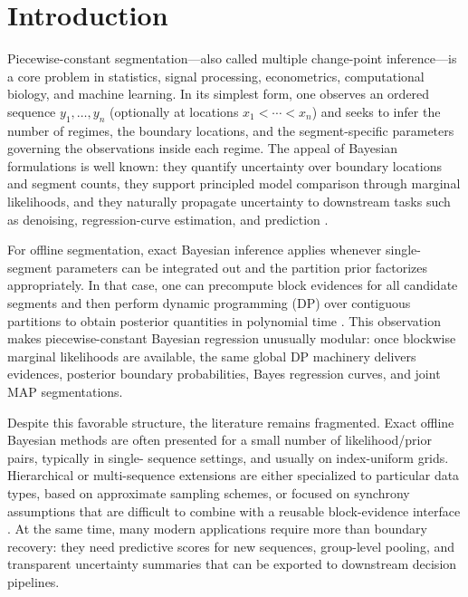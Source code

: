 \section{Introduction}

Piecewise-constant segmentation---also called multiple change-point inference---is a core
problem in statistics, signal processing, econometrics, computational biology, and machine
learning. In its simplest form, one observes an ordered sequence $y_1,\dots,y_n$ (optionally at
locations $x_1<\cdots<x_n$) and seeks to infer the number of regimes, the boundary locations,
and the segment-specific parameters governing the observations inside each regime. The appeal of
Bayesian formulations is well known: they quantify uncertainty over boundary locations and
segment counts, they support principled model comparison through marginal likelihoods, and they
naturally propagate uncertainty to downstream tasks such as denoising, regression-curve
estimation, and prediction \citep{barry1992ppm, barry1993bayesCP, fearnhead2006exact,
  hutter2006bpcr}.

For offline segmentation, exact Bayesian inference applies whenever single-segment
parameters can be integrated out and the partition prior factorizes appropriately. In that case,
one can precompute block evidences for all candidate segments and then perform dynamic
programming (DP) over contiguous partitions to obtain posterior quantities in polynomial time
\citep{fearnhead2006exact, hutter2006bpcr}. This observation makes piecewise-constant Bayesian
regression unusually modular: once blockwise marginal likelihoods are available, the same global
DP machinery delivers evidences, posterior boundary probabilities, Bayes regression curves, and
joint MAP segmentations.

Despite this favorable structure, the literature remains fragmented. Exact offline Bayesian
methods are often presented for a small number of likelihood/prior pairs, typically in single-
sequence settings, and usually on index-uniform grids. Hierarchical or multi-sequence extensions
are either specialized to particular data types, based on approximate sampling schemes, or focused
on synchrony assumptions that are difficult to combine with a reusable block-evidence interface
\citep{carlin1992hierBayesCP, fearnhead2011dependence, fan2017basic, quinlan2024jrpm}. At the
same time, many modern applications require more than boundary recovery: they need predictive
scores for new sequences, group-level pooling, and transparent uncertainty summaries that can be
exported to downstream decision pipelines.

